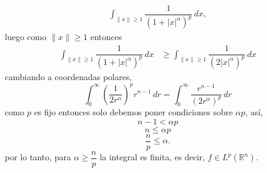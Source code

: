 \begin{itemize}
\begin{sol}
\begin{align*}
    \int_{\|x\|\geq 1} \dfrac{1}{(1 + |x|^\alpha)^p} \, dx,
  \end{align*} 
  luego como $\|x\|\geq 1$  entonces 
  \begin{align*}
    \int_{\|x\|\geq 1} \dfrac{1}{(1 + |x|^\alpha)^p} \, dx
    &\geq \int_{\|x\|\geq 1} \dfrac{1}{(2 |x|^\alpha)^p} \, dx
  \end{align*} 
  cambiando a coordenadas polares,
\[ 
 \int_{0}^{\infty} \left( \frac{1}{2r^{\alpha}} \right)^{p} r^{n-1} \, dr = \int_{0}^{\infty} \frac{r^{n-1}}{(2r^{\alpha})^{p}} \, dr 
\]
como $p$ es fijo entonces solo debemos poner condiciones sobre $\alpha p$, así, 
\[ 
n - 1 < \alpha p 
\]
\[ 
n \leq \alpha p 
\]
\[ 
\frac{n}{p} \leq \alpha. 
\]
por lo tanto, para \( \alpha \geq \dfrac{n}{p} \) la integral es finita, es decir, \( f \in L^p(\mathbb{R}^n) \). 
\end{sol}
\end{itemize}
